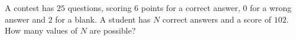 A contest has $25$ questions, scoring $6$ points for a correct answer, $0$ for a wrong answer and $2$ for a blank. A student has $N$ correct answers and a score of $102$. How many values of $N$ are possible?
